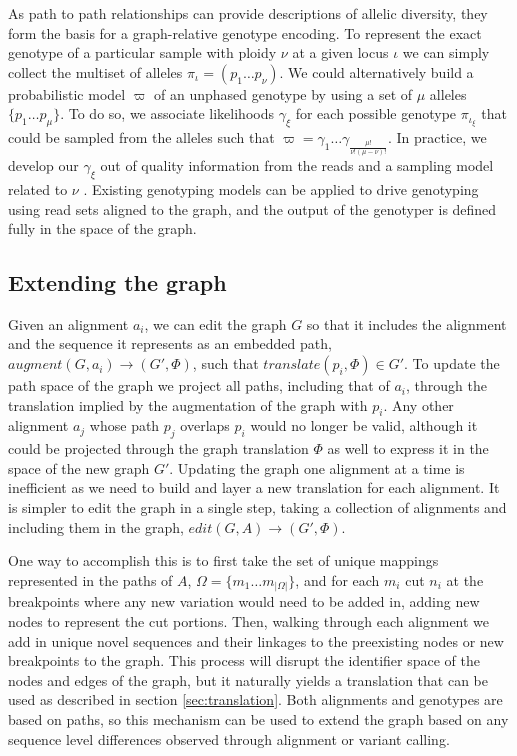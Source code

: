 \documentclass[a4paper,12pt,numbered,oneside]{Classes/PhDThesisPSnPDF}
\begin{document}
As path to path relationships can provide descriptions of allelic diversity, they form the basis for a graph-relative genotype encoding.
To represent the exact genotype of a particular sample with ploidy $\nu$ at a given locus $\iota$ we can simply collect the multiset of alleles $\pi_\iota = ( p_1 \ldots p_\nu)$.
We could alternatively build a probabilistic model $\varpi$ of an unphased genotype by using a set of $\mu$ alleles $\{ p_1 \ldots p_\mu\}$.
To do so, we associate likelihoods $\gamma_\xi$ for each possible genotype $\pi_{\iota_\xi}$ that could be sampled from the alleles such that $\varpi = \gamma_1 \ldots \gamma_{\frac{\mu!}{\nu!(\mu-\nu)!} }$.
In practice, we develop our $\gamma_\xi$ out of quality information from the reads and a sampling model related to $\nu$ \cite{garrison2012haplotype,li2011statistical}.
Existing genotyping models can be applied to drive genotyping using read sets aligned to the graph, and the output of the genotyper is defined fully in the space of the graph.

\subsection{Extending the graph}
\label{sec:extending}

Given an alignment $a_i$, we can edit the graph $G$ so that it includes the alignment and the sequence it represents as an embedded path, $augment(G, a_i) \to (G', \Phi)$, such that $translate(p_i, \Phi) \in G'$.
To update the path space of the graph we project all paths, including that of $a_i$, through the translation implied by the augmentation of the graph with $p_i$.
Any other alignment $a_j$ whose path $p_j$ overlaps $p_i$ would no longer be valid, although it could be projected through the graph translation $\Phi$ as well to express it in the space of the new graph $G'$.
Updating the graph one alignment at a time is inefficient as we need to build and layer a new translation for each alignment.
It is simpler to edit the graph in a single step, taking a collection of alignments and including them in the graph, $edit(G, A) \to (G', \Phi)$.

One way to accomplish this is to first take the set of unique mappings represented in the paths of $A$, $\Omega = \{ m_1 \ldots m_{|\Omega|}\}$, and for each $m_i$ cut $n_i$ at the breakpoints where any new variation would need to be added in, adding new nodes to represent the cut portions.
Then, walking through each alignment we add in unique novel sequences and their linkages to the preexisting nodes or new breakpoints to the graph.
This process will disrupt the identifier space of the nodes and edges of the graph, but it naturally yields a translation that can be used as described in section \ref{sec:translation}.
Both alignments and genotypes are based on paths, so this mechanism can be used to extend the graph based on any sequence level differences observed through alignment or variant calling.
\end{document}
